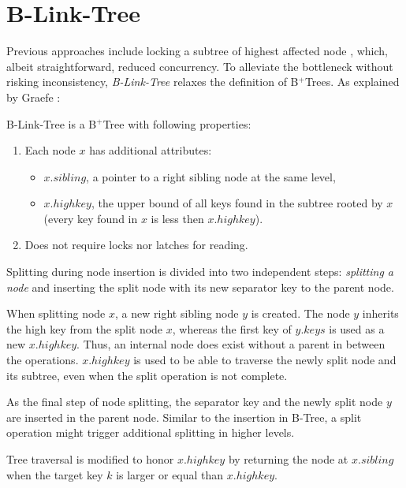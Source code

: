 \section{B-Link-Tree}\label{section:b-link-tree}

Previous approaches include locking a subtree of highest affected node \cite{samadi1976b}, which, albeit straightforward, reduced concurrency. To alleviate the bottleneck without risking inconsistency, \textit{B-Link-Tree} relaxes the definition of B$^+$Trees. As explained by Graefe \cite{goetz-tech}:

\begin{definition}
  B-Link-Tree is a B$^+$Tree with following properties:
  \begin{enumerate}
    \item Each node $x$ has additional attributes:
          \begin{itemize}
            \item $x.sibling$, a pointer to a right sibling node at the same level,
            \item $x.highkey$, the upper bound of all keys found in the subtree rooted by $x$ (every key found in $x$ is less then $x.highkey$).
          \end{itemize}
    \item Does not require locks nor latches for reading.
  \end{enumerate}
\end{definition}



Splitting during node insertion is divided into two independent steps:  \textit{splitting a node} and inserting the split node with its new separator key to the parent node.

When splitting node $x$, a new right sibling node $y$ is created. The node $y$ inherits the high key from the split node $x$, whereas the first key of $y.keys$ is used as a new $x.highkey$. Thus, an internal node does exist without a parent in between the operations. $x.highkey$ is used to be able to traverse the newly split node and its subtree, even when the split operation is not complete.

As the final step of node splitting, the separator key and the newly split node $y$ are inserted in the parent node. Similar to the insertion in B-Tree, a split operation might trigger additional splitting in higher levels.

Tree traversal is modified to honor $x.highkey$ by returning the node at $x.sibling$ when the target key $k$ is larger or equal than $x.highkey$.


